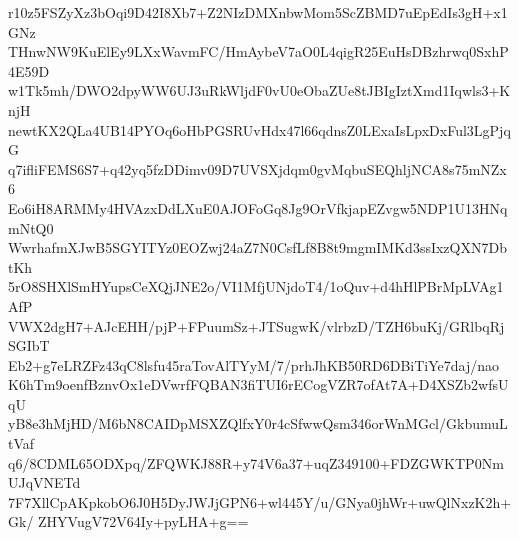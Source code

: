 r10z5FSZyXz3bOqi9D42I8Xb7+Z2NIzDMXnbwMom5ScZBMD7uEpEdIs3gH+x1GNz
THnwNW9KuElEy9LXxWavmFC/HmAybeV7aO0L4qigR25EuHsDBzhrwq0SxhP4E59D
w1Tk5mh/DWO2dpyWW6UJ3uRkWljdF0vU0eObaZUe8tJBIgIztXmd1Iqwls3+KnjH
newtKX2QLa4UB14PYOq6oHbPGSRUvHdx47l66qdnsZ0LExaIsLpxDxFul3LgPjqG
q7ifliFEMS6S7+q42yq5fzDDimv09D7UVSXjdqm0gvMqbuSEQhljNCA8s75mNZx6
Eo6iH8ARMMy4HVAzxDdLXuE0AJOFoGq8Jg9OrVfkjapEZvgw5NDP1U13HNqmNtQ0
WwrhafmXJwB5SGYITYz0EOZwj24aZ7N0CsfLf8B8t9mgmIMKd3ssIxzQXN7DbtKh
5rO8SHXlSmHYupsCeXQjJNE2o/VI1MfjUNjdoT4/1oQuv+d4hHlPBrMpLVAg1AfP
VWX2dgH7+AJcEHH/pjP+FPuumSz+JTSugwK/vlrbzD/TZH6buKj/GRlbqRjSGIbT
Eb2+g7eLRZFz43qC8lsfu45raTovAlTYyM/7/prhJhKB50RD6DBiTiYe7daj/nao
K6hTm9oenfBznvOx1eDVwrfFQBAN3fiTUI6rECogVZR7ofAt7A+D4XSZb2wfsUqU
yB8e3hMjHD/M6bN8CAIDpMSXZQlfxY0r4cSfwwQsm346orWnMGcl/GkbumuLtVaf
q6/8CDML65ODXpq/ZFQWKJ88R+y74V6a37+uqZ349100+FDZGWKTP0NmUJqVNETd
7F7XllCpAKpkobO6J0H5DyJWJjGPN6+wl445Y/u/GNya0jhWr+uwQlNxzK2h+Gk/
ZHYVugV72V64Iy+pyLHA+g==
